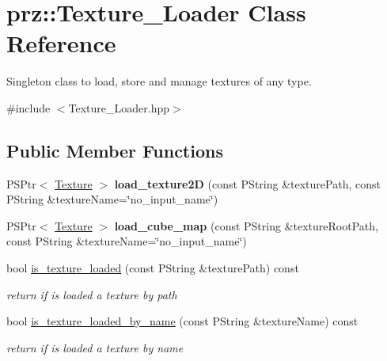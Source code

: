 \hypertarget{classprz_1_1_texture___loader}{}\section{prz\+::Texture\+\_\+\+Loader Class Reference}
\label{classprz_1_1_texture___loader}


Singleton class to load, store and manage textures of any type.  




{\ttfamily \#include $<$Texture\+\_\+\+Loader.\+hpp$>$}

\subsection*{Public Member Functions}
\begin{DoxyCompactItemize}
\item 
\mbox{\label{classprz_1_1_texture___loader_a8b577eb323df37bf656ce369169a47f9}} 
P\+S\+Ptr$<$ \mbox{\hyperlink{classprz_1_1_texture}{Texture}} $>$ {\bfseries load\+\_\+texture2D} (const P\+String \&texture\+Path, const P\+String \&texture\+Name=\char`\"{}no\+\_\+input\+\_\+name\char`\"{})
\item 
\mbox{\label{classprz_1_1_texture___loader_ad80e66e133c826456276d924e87b8df2}} 
P\+S\+Ptr$<$ \mbox{\hyperlink{classprz_1_1_texture}{Texture}} $>$ {\bfseries load\+\_\+cube\+\_\+map} (const P\+String \&texture\+Root\+Path, const P\+String \&texture\+Name=\char`\"{}no\+\_\+input\+\_\+name\char`\"{})
\item 
bool \mbox{\hyperlink{classprz_1_1_texture___loader_aea5eb425e3e4b39767fcf224415686ba}{is\+\_\+texture\+\_\+loaded}} (const P\+String \&texture\+Path) const
\begin{DoxyCompactList}\small\item\em return if is loaded a texture by path \end{DoxyCompactList}\item 
bool \mbox{\hyperlink{classprz_1_1_texture___loader_ac824d4884c5ba02477f60e296ae21e1c}{is\+\_\+texture\+\_\+loaded\+\_\+by\+\_\+name}} (const P\+String \&texture\+Name) const
\begin{DoxyCompactList}\small\item\em return if is loaded a texture by name \end{DoxyCompactList}\item 

\end{DoxyCompactItemize}
